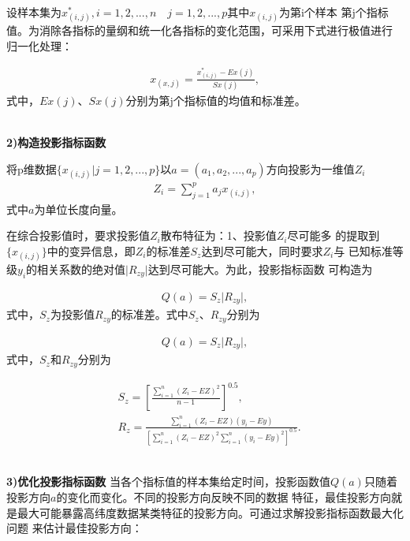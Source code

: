 \documentclass{whutmod}
\begin{document}
\begin{spacing}{1.2}
设样本集为$x^*_{(i,j)},i=1,2,...,n\quad j=1,2,...,p$其中$x_{(i,j)}$为第i个样本
第j个指标值。为消除各指标的量纲和统一化各指标的变化范围，可采用下式进行极值进行
归一化处理：

\begin{equation}
	\label{2}
	\begin{split}
		x_{(x,j)}=\frac{x^*_{(i,j)}-Ex(j)}{Sx(j)},
	\end{split}
\end{equation}
式中，$Ex(j)$、$Sx(j)$分别为第j个指标值的均值和标准差。

~\\
\textbf{2)构造投影指标函数}

将p维数据$\{x_{(i,j)}|j=1,2,...,p\}$以$a=(a_1,a_2,...,a_p)$方向投影为一维值$Z_i$
\begin{equation}
	\label{2}
	\begin{split}
		Z_i=\sum_{j=1}^pa_jx_{(i,j)},
	\end{split}
\end{equation}
式中$a$为单位长度向量。

在综合投影值时，要求投影值$Z_i$散布特征为：1、投影值$Z_i$尽可能多
的提取到$\{x_{(i,j)}\}$中的变异信息，即$Z_i$的标准差$S_z$达到尽可能大，同时要求$Z_i$与
已知标准等级$y_i$的相关系数的绝对值$\lvert R_{zy} \rvert$达到尽可能大。为此，投影指标函数
可构造为

\begin{equation}
	\label{2}
	\begin{split}
		Q(a)=S_z\lvert R_{zy} \rvert,
	\end{split}
\end{equation}
式中，$S_z$为投影值$R_{zy}$的标准差。式中$S_z$、$R_{zy}$分别为

\begin{equation}
	\label{2}
	\begin{split}
		Q(a)=S_z\lvert R_{zy} \rvert,
	\end{split}
\end{equation}
式中，$S_z$和$R_{zy}$分别为

\begin{equation}
	\label{2}
	\begin{split}
		&S_z=[\frac{\sum_{i=1}^n(Z_i-EZ)^2}{n-1}]^{0.5},\\
		&R_z=\frac{\sum_{i=1}^n(Z_i-EZ)(y_i-Ey)}{[\sum_{i=1}^n(Z_i-EZ)^2\sum_{i=1}^n(y_i-Ey)^2]^{0.5}}.
	\end{split}
\end{equation}

~\\
\textbf{3)优化投影指标函数}
当各个指标值的样本集给定时间，投影函数值$Q(a)$只随着投影方向$a$的变化而变化。不同的投影方向反映不同的数据
特征，最佳投影方向就是最大可能暴露高纬度数据某类特征的投影方向。可通过求解投影指标函数最大化问题
来估计最佳投影方向：


\end{spacing}
\end{document}
